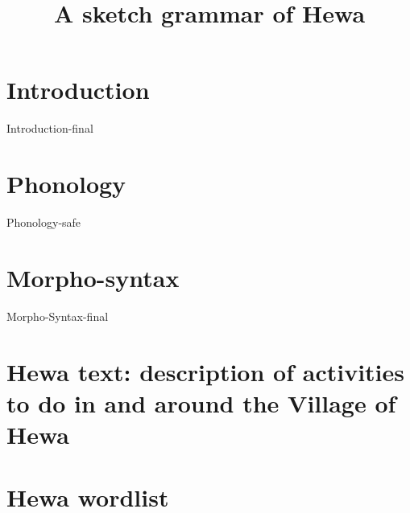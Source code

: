 \documentclass{article}
\title{A sketch grammar of Hewa}
\begin{document}
\tableofcontents


\section{Introduction}
{Introduction-final}

\section{Phonology}
{Phonology-safe}

\section{Morpho-syntax}
{Morpho-Syntax-final}

\appendix
\section{Hewa text: description of activities to do in and around the Village of Hewa}

\section{Hewa wordlist}

\printbibliography
\end{document}
